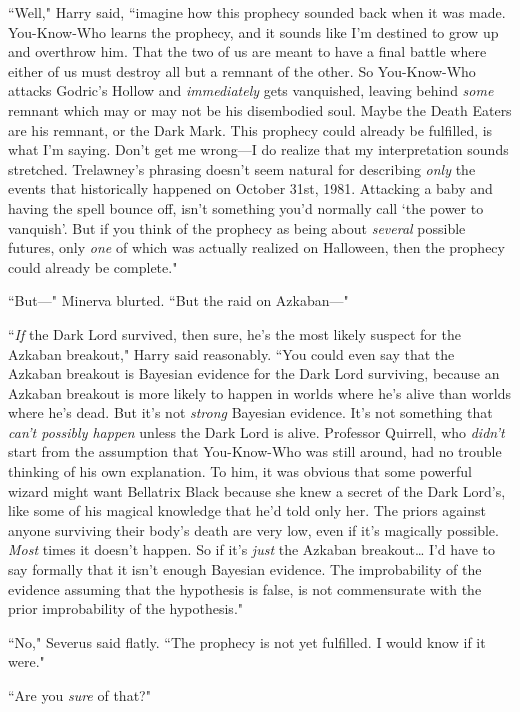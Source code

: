 ``Well," Harry said, ``imagine how this prophecy sounded back when it was made. You-Know-Who learns the prophecy, and it sounds like I'm destined to grow up and overthrow him. That the two of us are meant to have a final battle where either of us must destroy all but a remnant of the other. So You-Know-Who attacks Godric's Hollow and \emph{immediately} gets vanquished, leaving behind \emph{some} remnant which may or may not be his disembodied soul. Maybe the Death Eaters are his remnant, or the Dark Mark. This prophecy could already be fulfilled, is what I'm saying. Don't get me wrong—I do realize that my interpretation sounds stretched. Trelawney's phrasing doesn't seem natural for describing \emph{only} the events that historically happened on October 31st, 1981. Attacking a baby and having the spell bounce off, isn't something you'd normally call `the power to vanquish'. But if you think of the prophecy as being about \emph{several} possible futures, only \emph{one} of which was actually realized on Halloween, then the prophecy could already be complete."

``But—" Minerva blurted. ``But the raid on Azkaban—"

``\emph{If} the Dark Lord survived, then sure, he's the most likely suspect for the Azkaban breakout," Harry said reasonably. ``You could even say that the Azkaban breakout is Bayesian evidence for the Dark Lord surviving, because an Azkaban breakout is more likely to happen in worlds where he's alive than worlds where he's dead. But it's not \emph{strong} Bayesian evidence. It's not something that \emph{can't possibly happen} unless the Dark Lord is alive. Professor Quirrell, who \emph{didn't} start from the assumption that You-Know-Who was still around, had no trouble thinking of his own explanation. To him, it was obvious that some powerful wizard might want Bellatrix Black because she knew a secret of the Dark Lord's, like some of his magical knowledge that he'd told only her. The priors against anyone surviving their body's death are very low, even if it's magically possible. \emph{Most} times it doesn't happen. So if it's \emph{just} the Azkaban breakout{\ldots} I'd have to say formally that it isn't enough Bayesian evidence. The improbability of the evidence assuming that the hypothesis is false, is not commensurate with the prior improbability of the hypothesis."

``No," Severus said flatly. ``The prophecy is not yet fulfilled. I would know if it were."

``Are you \emph{sure} of that?"

